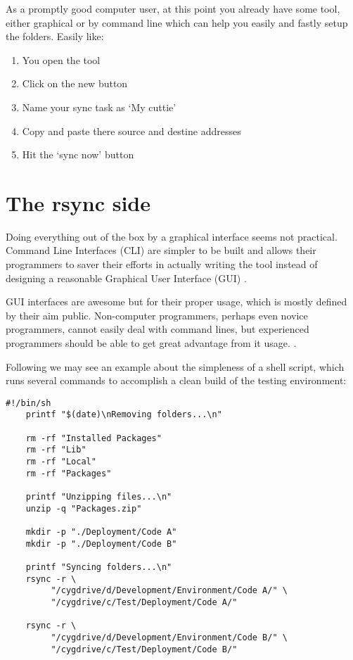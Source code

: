     As a promptly good computer user, at this point you already have some tool,
    either graphical or by command line which can help you easily and fastly
    setup the folder\q s. Easily like:

    \begin{enumerate}
        \item You open the tool
        \item Click on the new button
        \item Name your sync task as `My cuttie'
        \item Copy and paste there source and destine addresses
        \item Hit the `sync now' button
    \end{enumerate}



    \section{The rsync side}

    Doing everything out of the box by a graphical interface seems not
    practical. Command Line Interfaces (CLI) are simpler to be built and allows
    their programmers to saver their efforts in actually writing the tool
    instead of designing a reasonable Graphical User Interface (GUI)
    \cite{quantificationOfInterface}.

    GUI interfaces are awesome but for their proper usage, which is mostly
    defined by their aim public. Non-computer programmers, perhaps even novice
    programmers, cannot easily deal with command lines, but experienced
    programmers should be able to get great advantage from it usage.
    \cite{commandLineInterface}.

    Following we may see an example about the simpleness of a shell script,
    which runs several commands to accomplish a clean build of the testing
    environment:

    \begin{lstlisting}[caption={rebuild\_workspace.sh}]
    #!/bin/sh
    printf "$(date)\nRemoving folders...\n"

    rm -rf "Installed Packages"
    rm -rf "Lib"
    rm -rf "Local"
    rm -rf "Packages"

    printf "Unzipping files...\n"
    unzip -q "Packages.zip"

    mkdir -p "./Deployment/Code A"
    mkdir -p "./Deployment/Code B"

    printf "Syncing folders...\n"
    rsync -r \
         "/cygdrive/d/Development/Environment/Code A/" \
         "/cygdrive/c/Test/Deployment/Code A/"

    rsync -r \
         "/cygdrive/d/Development/Environment/Code B/" \
         "/cygdrive/c/Test/Deployment/Code B/"
    \end{lstlisting}
    \vspace*{-4mm}

